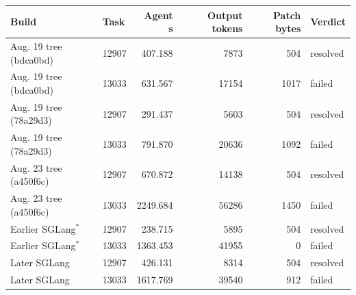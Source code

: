\begin{tabular}{llrrrl}
\toprule
Build & Task & Agent s & Output tokens & Patch bytes & Verdict \\
\midrule
Aug. 19 tree (bdca0bd) & 12907 & 407.188 & 7873 & 504 & resolved \\
Aug. 19 tree (bdca0bd) & 13033 & 631.567 & 17154 & 1017 & failed \\
Aug. 19 tree (78a29d3) & 12907 & 291.437 & 5603 & 504 & resolved \\
Aug. 19 tree (78a29d3) & 13033 & 791.870 & 20636 & 1092 & failed \\
Aug. 23 tree (a450f6c) & 12907 & 670.872 & 14138 & 504 & resolved \\
Aug. 23 tree (a450f6c) & 13033 & 2249.684 & 56286 & 1450 & failed \\
Earlier SGLang$^{*}$ & 12907 & 238.715 & 5895 & 504 & resolved \\
Earlier SGLang$^{*}$ & 13033 & 1363.453 & 41955 & 0 & failed \\
Later SGLang & 12907 & 426.131 & 8314 & 504 & resolved \\
Later SGLang & 13033 & 1617.769 & 39540 & 912 & failed \\
\bottomrule
\end{tabular}
